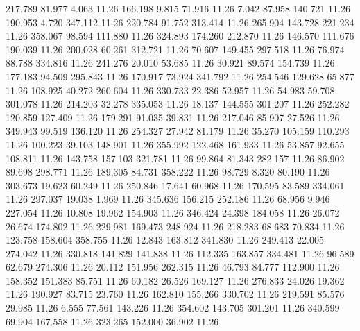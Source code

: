  217.789   81.977    4.063        11.26
 166.198    9.815   71.916        11.26
   7.042   87.958  140.721        11.26
 190.953    4.720  347.112        11.26
 220.784   91.752  313.414        11.26
 265.904  143.728  221.234        11.26
 358.067   98.594  111.880        11.26
 324.893  174.260  212.870        11.26
 146.570  111.676  190.039        11.26
 200.028   60.261  312.721        11.26
  70.607  149.455  297.518        11.26
  76.974   88.788  334.816        11.26
 241.276   20.010   53.685        11.26
  30.921   89.574  154.739        11.26
 177.183   94.509  295.843        11.26
 170.917   73.924  341.792        11.26
 254.546  129.628   65.877        11.26
 108.925   40.272  260.604        11.26
 330.733   22.386   52.957        11.26
  54.983   59.708  301.078        11.26
 214.203   32.278  335.053        11.26
  18.137  144.555  301.207        11.26
 252.282  120.859  127.409        11.26
 179.291   91.035   39.831        11.26
 217.046   85.907   27.526        11.26
 349.943   99.519  136.120        11.26
 254.327   27.942   81.179        11.26
  35.270  105.159  110.293        11.26
 100.223   39.103  148.901        11.26
 355.992  122.468  161.933        11.26
  53.857   92.655  108.811        11.26
 143.758  157.103  321.781        11.26
  99.864   81.343  282.157        11.26
  86.902   89.698  298.771        11.26
 189.305   84.731  358.222        11.26
  98.729    8.320   80.190        11.26
 303.673   19.623   60.249        11.26
 250.846   17.641   60.968        11.26
 170.595   83.589  334.061        11.26
 297.037   19.038    1.969        11.26
 345.636  156.215  252.186        11.26
  68.956    9.946  227.054        11.26
  10.808   19.962  154.903        11.26
 346.424   24.398  184.058        11.26
  26.072   26.674  174.802        11.26
 229.981  169.473  248.924        11.26
 218.283   68.683   70.834        11.26
 123.758  158.604  358.755        11.26
  12.843  163.812  341.830        11.26
 249.413   22.005  274.042        11.26
 330.818  141.829  141.838        11.26
 112.335  163.857  334.481        11.26
  96.589   62.679  274.306        11.26
  20.112  151.956  262.315        11.26
  46.793   84.777  112.900        11.26
 158.352  151.383   85.751        11.26
  60.182   26.526  169.127        11.26
 276.833   24.026   19.362        11.26
 190.927   83.715   23.760        11.26
 162.810  155.266  330.702        11.26
 219.591   85.576   29.985        11.26
   6.555   77.561  143.226        11.26
 354.602  143.705  301.201        11.26
 340.599   69.904  167.558        11.26
 323.265  152.000   36.902        11.26
